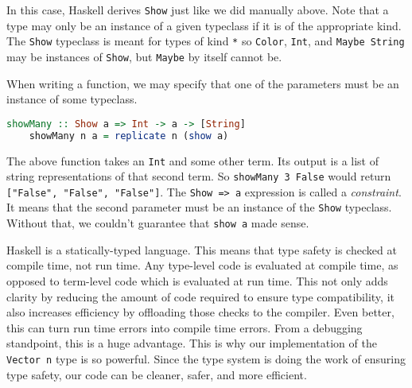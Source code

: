 \documentclass[MS, xcolor=dvipsnames]{wfuthesis}
\theoremstyle{definition}
\begin{document}
In this case, Haskell derives \lstinline{Show} just like we did manually above. Note that a type may only be an instance of a given typeclass if it is of the appropriate kind. The \lstinline{Show} typeclass is meant for types of kind \lstinline{*} so \lstinline{Color}, \lstinline{Int}, and \lstinline{Maybe String} may be instances of \lstinline{Show}, but \lstinline{Maybe} by itself cannot be. \par
When writing a function,  we may specify that one of the parameters must be an instance of some typeclass.
\begin{lstlisting}[language=Haskell]
showMany :: Show a => Int -> a -> [String]
    showMany n a = replicate n (show a)
\end{lstlisting}
The above function takes an \lstinline{Int} and some other term. Its output is a list of string representations of that second term. So \lstinline{showMany 3 False} would return \lstinline{["False", "False", "False"]}. The \lstinline{Show => a} expression is called a \emph{constraint}. It means that the second parameter must be an instance of the \lstinline{Show} typeclass. Without that, we couldn't guarantee that \lstinline{show a} made sense. \par
Haskell is a statically-typed language. This means that type safety is checked at compile time, not run time. Any type-level code is evaluated at compile time, as opposed to term-level code which is evaluated at run time. This not only adds clarity by reducing the amount of code required to ensure type compatibility, it also increases efficiency by offloading those checks to the compiler. Even better, this can turn run time errors into compile time errors. From a debugging standpoint, this is a huge advantage. This is why our implementation of the \lstinline{Vector n} type is so powerful. Since the type system is doing the work of ensuring type safety, our code can be cleaner, safer, and more efficient.

\end{document}
